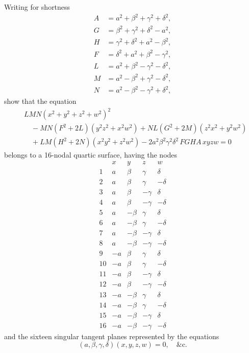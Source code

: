 \documentclass[11pt,a4paper]{article}
\theoremstyle{definition}
\begin{document}
Writing for shortness
\[
\begin{aligned}
A &= a^2+\beta^2+\gamma^2+\delta^2, \\
G &= \beta^2+\gamma^2+\delta^2-a^2, \\
H &= \gamma^2+\delta^2+a^2-\beta^2, \\
F &= \delta^2+a^2+\beta^2-\gamma^2, \\
L &= a^2+\beta^2-\gamma^2-\delta^2, \\
M &= a^2-\beta^2+\gamma^2-\delta^2, \\
N &= a^2-\beta^2-\gamma^2+\delta^2,
\end{aligned}
\]
show that the equation
\[
\begin{aligned}
&LMN(x^2+y^2+z^2+w^2)^2 \\
&\quad - MN(F^2+2L)(y^2z^2+x^2w^2) + NL(G^2+2M)(z^2x^2+y^2w^2) \\
&\quad + LM(H^2+2N)(x^2y^2+z^2w^2) - 2a^2\beta^2\gamma^2\delta^2\, FGHA\, xyzw = 0
\end{aligned}
\]
belongs to a 16-nodal quartic surface, having the nodes
\[
\begin{array}{c|cccc}
& x & y & z & w \\ \hline
1 & a & \beta & \gamma & \delta \\
2 & a & \beta & \gamma & -\delta \\
3 & a & \beta & -\gamma & \delta \\
4 & a & \beta & -\gamma & -\delta \\
5 & a & -\beta & \gamma & \delta \\
6 & a & -\beta & \gamma & -\delta \\
7 & a & -\beta & -\gamma & \delta \\
8 & a & -\beta & -\gamma & -\delta \\
9 & -a & \beta & \gamma & \delta \\
10 & -a & \beta & \gamma & -\delta \\
11 & -a & \beta & -\gamma & \delta \\
12 & -a & \beta & -\gamma & -\delta \\
13 & -a & -\beta & \gamma & \delta \\
14 & -a & -\beta & \gamma & -\delta \\
15 & -a & -\beta & -\gamma & \delta \\
16 & -a & -\beta & -\gamma & -\delta
\end{array}
\]
and the sixteen singular tangent planes represented by the equations
\[
(a,\beta,\gamma,\delta)(x,y,z,w) = 0, \quad \&\text{c.}
\]
\end{document}
